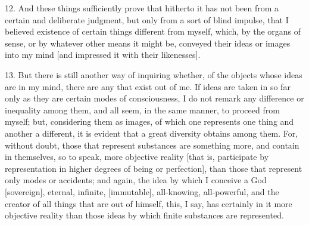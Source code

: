 12. And these things sufficiently prove that hitherto it has not been from a certain and deliberate judgment, but only from a sort of blind impulse, that I believed existence of certain things different from myself, which, by the organs of sense, or by whatever other means it might be, conveyed their ideas or images into my mind [and impressed it with their likenesses].

13. But there is still another way of inquiring whether, of the objects whose ideas are in my mind, there are any that exist out of me. If ideas are taken in so far only as they are certain modes of consciousness, I do not remark any difference or inequality among them, and all seem, in the same manner, to proceed from myself; but, considering them as images, of which one represents one thing and another a different, it is evident that a great diversity obtains among them. For, without doubt, those that represent substances are something more, and contain in themselves, so to speak, more objective reality [that is, participate by representation in higher degrees of being or perfection], than those that represent only modes or accidents; and again, the idea by which I conceive a God [sovereign], eternal, infinite, [immutable], all-knowing, all-powerful, and the creator of all things that are out of himself, this, I say, has certainly in it more objective reality than those ideas by which finite substances are represented.

